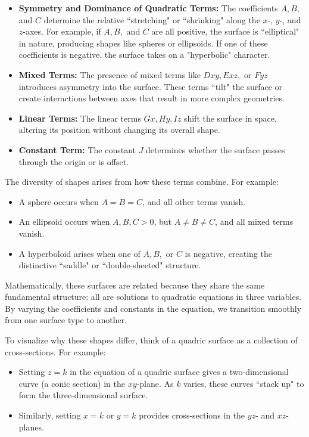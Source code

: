 \begin{itemize}
    \item \textbf{Symmetry and Dominance of Quadratic Terms:} The coefficients \( A, B, \) and \( C \) determine the relative ``stretching" or ``shrinking" along the \( x \)-, \( y \)-, and \( z \)-axes. For example, if \( A, B, \) and \( C \) are all positive, the surface is ``elliptical" in nature, producing shapes like spheres or ellipsoids. If one of these coefficients is negative, the surface takes on a "hyperbolic" character.
    
    \item \textbf{Mixed Terms:} The presence of mixed terms like \( Dxy, Exz, \) or \( Fyz \) introduces asymmetry into the surface. These terms ``tilt" the surface or create interactions between axes that result in more complex geometries.

    \item \textbf{Linear Terms:} The linear terms \( Gx, Hy, Iz \) shift the surface in space, altering its position without changing its overall shape.

    \item \textbf{Constant Term:} The constant \( J \) determines whether the surface passes through the origin or is offset.
\end{itemize}

\noindent The diversity of shapes arises from how these terms combine. For example:
\begin{itemize}
    \item A sphere occurs when \( A = B = C \), and all other terms vanish.
    \item An ellipsoid occurs when \( A, B, C > 0 \), but \( A \neq B \neq C \), and all mixed terms vanish.
    \item A hyperboloid arises when one of \( A, B, \) or \( C \) is negative, creating the distinctive ``saddle" or ``double-sheeted" structure.
\end{itemize}

\noindent Mathematically, these surfaces are related because they share the same fundamental structure: all are solutions to quadratic equations in three variables. By varying the coefficients and constants in the equation, we transition smoothly from one surface type to another.


\noindent To visualize why these shapes differ, think of a quadric surface as a collection of cross-sections. For example:
\begin{itemize}
    \item Setting \( z = k \) in the equation of a quadric surface gives a two-dimensional curve (a conic section) in the \( xy \)-plane. As \( k \) varies, these curves ``stack up" to form the three-dimensional surface.
    \item Similarly, setting \( x = k \) or \( y = k \) provides cross-sections in the \( yz \)- and \( xz \)-planes.
\end{itemize}

